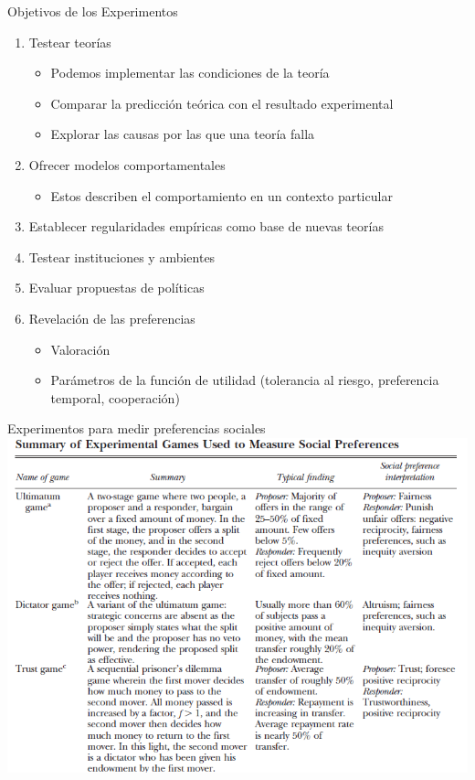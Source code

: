 \documentclass[
  ignorenonframetext,
]{beamer}
\providecommand{\tightlist}{%
  \setlength{\itemsep}{0pt}\setlength{\parskip}{0pt}}
\begin{document}
\begin{frame}{Objetivos de los Experimentos}
\protect\hypertarget{objetivos-de-los-experimentos}{}
\begin{enumerate}
\item
  Testear teorías

  \begin{itemize}
  \tightlist
  \item
    Podemos implementar las condiciones de la teoría
  \item
    Comparar la predicción teórica con el resultado experimental
  \item
    Explorar las causas por las que una teoría falla
  \end{itemize}
\item
  Ofrecer modelos comportamentales

  \begin{itemize}
  \tightlist
  \item
    Estos describen el comportamiento en un contexto particular
  \end{itemize}
\item
  Establecer regularidades empíricas como base de nuevas teorías
\item
  Testear instituciones y ambientes
\item
  Evaluar propuestas de políticas
\item
  Revelación de las preferencias

  \begin{itemize}
  \tightlist
  \item
    Valoración
  \item
    Parámetros de la función de utilidad (tolerancia al riesgo,
    preferencia temporal, cooperación)
  \end{itemize}
\end{enumerate}
\end{frame}

\begin{frame}{Experimentos para medir preferencias sociales}
\protect\hypertarget{experimentos-para-medir-preferencias-sociales}{}
\includegraphics{figs/lab_social_preferences1.png}
\end{frame}
\end{document}

